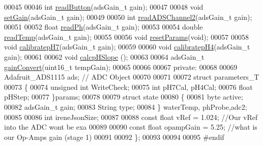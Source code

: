 \begin{DoxyCode}
00045 
00046     \textcolor{keywordtype}{int} \hyperlink{class_irene3000_ae0e0a5b773c3625b44c1d113c76a1540}{readButton}(adsGain\_t gain);
00047 
00048     \textcolor{keywordtype}{void} \hyperlink{class_irene3000_aff7c5da186b388e7272e63ff88a20c34}{setGain}(adsGain\_t gain);
00049 
00050     \textcolor{keywordtype}{int} \hyperlink{class_irene3000_ae73bd2ed14a199a7e83f4d6458476a7c}{readADSChannel2}(adsGain\_t gain);
00051 
00052     \textcolor{keywordtype}{float} \hyperlink{class_irene3000_abf3db725fabb0634ec889b32068a5eec}{readPh}(adsGain\_t gain);
00053 
00054     \textcolor{keywordtype}{double} \hyperlink{class_irene3000_a94ad40f281d83ad1be20bf1edd6fe802}{readTemp}(adsGain\_t gain);
00055 
00056     \textcolor{keywordtype}{void} \hyperlink{class_irene3000_a0fba280e8b7c881307efa31281aa691d}{resetParams}(\textcolor{keywordtype}{void});
00057 
00058     \textcolor{keywordtype}{void} \hyperlink{class_irene3000_a2e810ddfa8b95eaa2446a408761c6bdc}{calibratepH7}(adsGain\_t gain);
00059 
00060     \textcolor{keywordtype}{void} \hyperlink{class_irene3000_a9772eeea2305fad6236a82e33e93892e}{calibratepH4}(adsGain\_t gain);
00061 
00062     \textcolor{keywordtype}{void} \hyperlink{class_irene3000_a81f6a79e546679692053f7ac1af49613}{calcpHSlope} ();
00063 
00064     adsGain\_t \hyperlink{class_irene3000_abcad62d1201a59f8dd3ba87048002728}{gainConvert}(uint16\_t tempGain);
00065 
00066 
00067 \textcolor{keyword}{private}:
00068 
00069     Adafruit\_ADS1115 ads;                                                                                  
               \textcolor{comment}{// ADC Object}
00070 
00071 
00072     \textcolor{keyword}{struct }parameters\_T
00073     \{
00074         \textcolor{keywordtype}{unsigned} \textcolor{keywordtype}{int} WriteCheck;
00075         \textcolor{keywordtype}{int} pH7Cal, pH4Cal;
00076         \textcolor{keywordtype}{float} pHStep;
00077     \}params;
00078 
00079     \textcolor{keyword}{struct }state
00080     \{
00081         byte active;
00082         adsGain\_t gain;
00083         String type;
00084     \} waterTemp, phProbe,adc2;
00085 
00086     \textcolor{keywordtype}{int} ireneJsonSize;
00087 
00088     \textcolor{keyword}{const} \textcolor{keywordtype}{float} vRef = 1.024;                                                            \textcolor{comment}{//Our vRef into
       the ADC wont be exa}
00089 
00090     \textcolor{keyword}{const} \textcolor{keywordtype}{float} opampGain = 5.25;                                 \textcolor{comment}{//what is our Op-Amps gain (stage 1)}
00091 
00092 \};
00093 
00094 
00095 \textcolor{preprocessor}{#endif}
\end{DoxyCode}
